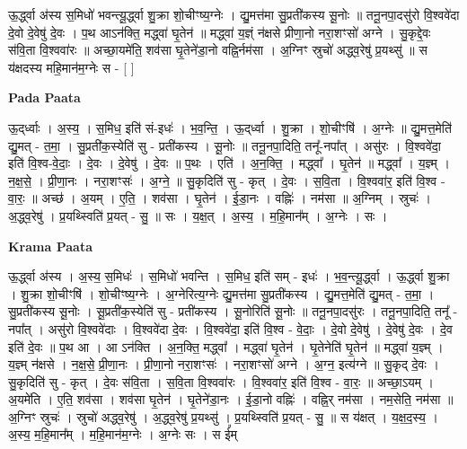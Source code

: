 \documentclass[17pt]{extarticle}
\begin{document}
ऊ॒र्द्ध्वा अ॑स्य स॒मिधो॑ भवन्त्यू॒र्द्ध्वा शु॒क्रा शो॒चीꣳष्य॒ग्नेः । द्यु॒मत्त॑मा सु॒प्रती॑कस्य सू॒नोः ॥ तनू॒नपा॒दसु॑रो वि॒श्ववे॑दा दे॒वो दे॒वेषु॑ दे॒वः । प॒थ आऽन॑क्ति॒ मद्ध्वा॑ घृ॒तेन॑ ॥ मद्ध्वा॑ य॒ज्ञ्ं न॑क्षसे प्रीणा॒नो नरा॒शꣳसो॑ अग्ने । सु॒कृद्दे॒वः स॑वि॒ता वि॒श्ववा॑रः ॥ अच्छा॒यमे॑ति॒ शव॑सा घृ॒तेने॑डा॒नो वह्नि॒र्नम॑सा । अ॒ग्निꣳ स्रुचो॑ अद्ध्व॒रेषु॑ प्र॒यथ्सु॑ ॥ स य॑क्षदस्य महि॒मान॑म॒ग्नेः स - [  ] \newline

\textbf{Pada Paata} \newline

ऊ॒द्‌र्ध्वाः । अ॒स्य॒ । स॒मिध॒ इति॑ सं-इधः॑ । भ॒व॒न्ति॒ । ऊ॒द्‌र्ध्वा । शु॒क्रा । शो॒चीꣳषि॑ । अ॒ग्नेः ॥ द्यु॒मत्त॒मेति॑ द्यु॒मत् - त॒मा॒ । सु॒प्रती॑क॒स्येति॑ सु - प्रती॑कस्य । सू॒नोः ॥ तनू॒नपा॒दिति॒ तनू᳚-नपा᳚त् । असु॑रः । वि॒श्ववे॑दा॒ इति॑ वि॒श्व-वे॒दाः॒ । दे॒वः । दे॒वेषु॑ । दे॒वः ॥ प॒थः । एति॑ । अ॒न॒क्ति॒ । मद्ध्वा᳚ । घृ॒तेन॑ ॥ मद्ध्वा᳚ । य॒ज्ञ्म् । न॒क्ष॒से॒ । प्री॒णा॒नः । नरा॒शꣳसः॑ । अ॒ग्ने॒ ॥ सु॒कृदिति॑ सु - कृत् । दे॒वः । स॒वि॒ता । वि॒श्ववा॑र॒ इति॑ वि॒श्व - वा॒रः॒ ॥ अच्छ॑ । अ॒यम् । ए॒ति॒ । शव॑सा । घृ॒तेन॑ । ई॒डा॒नः । वह्निः॑ । नम॑सा ॥ अ॒ग्निम् । स्रुचः॑ । अ॒द्ध्व॒रेषु॑ । प्र॒यथ्स्विति॑ प्र॒यत् - सु॒ ॥ सः । य॒क्ष॒त् । अ॒स्य॒ । म॒हि॒मान᳚म् । अ॒ग्नेः । सः ।  \newline


\textbf{Krama Paata} \newline

ऊ॒र्द्ध्वा अ॑स्य । अ॒स्य॒ स॒मिधः॑ । स॒मिधो॑ भवन्ति । स॒मिध॒ इति॑ सम् - इधः॑ । भ॒व॒न्त्यू॒र्द्ध्वा । ऊ॒र्द्ध्वा शु॒क्रा । शु॒क्रा शो॒चीꣳषि॑ । शो॒चीꣳष्य॒ग्नेः । अ॒ग्नेरित्य॒ग्नेः  द्यु॒मत्त॑मा सु॒प्रती॑कस्य । द्यु॒मत्त॒मेति॑ द्यु॒मत् - त॒मा॒ । सु॒प्रती॑कस्य सू॒नोः । सू॒प्रती॑क॒स्येति॑ सु - प्रती॑कस्य । सू॒नोरिति॑ सू॒नोः ॥ तनू॒नपा॒दसु॑रः । तनू॒नपा॒दिति॒ तनू᳚ - नपा᳚त् । असु॑रो वि॒श्ववे॑दाः । वि॒श्ववे॑दा दे॒वः । वि॒श्ववे॑दा॒ इति॑ वि॒श्व - वे॒दाः॒ । दे॒वो दे॒वेषु॑ । दे॒वेषु॑ दे॒वः । दे॒व इति॑ दे॒वः ॥ प॒थ आ । आ ऽन॑क्ति । अ॒न॒क्ति॒ मद्ध्वा᳚ । मद्ध्वा॑ घृ॒तेन॑ । घृ॒तेनेति॑ घृ॒तेन॑ ॥ मद्ध्वा॑ य॒ज्ञ्म् । य॒ज्ञ्म् न॑क्षसे । न॒क्ष॒से॒ प्री॒णा॒नः । प्री॒णा॒नो नरा॒शꣳसः॑ । नरा॒शꣳसो॑ अग्ने । अ॒ग्न॒ इत्य॑ग्ने ॥ सु॒कृद् दे॒वः । सु॒कृदिति॑ सु - कृत् । दे॒वः स॑वि॒ता । स॒वि॒ता वि॒श्ववा॑रः । वि॒श्ववा॑र॒ इति॑ वि॒श्व - वा॒रः॒ ॥ अच्छा॒ऽयम् । अ॒यमे॑ति । ए॒ति॒ शव॑सा । शव॑सा घृ॒तेन॑ । घृ॒तेने॑डा॒नः । ई॒डा॒नो वह्निः॑ । वह्नि॒र् नम॑सा । नम॒सेति॒ नम॑सा ॥ अ॒ग्निꣳ स्रुचः॑ । स्रुचो॑ अद्ध्व॒रेषु॑ । अ॒द्ध्व॒रेषु॑ प्र॒यथ्सु॑ । प्र॒यथ्स्विति॑ प्र॒यत् - सु॒ ॥ स य॑क्षत् । य॒क्ष॒द॒स्य॒ । अ॒स्य॒ म॒हि॒मान᳚म् । म॒हि॒मान॑म॒ग्नेः । अ॒ग्नेः सः । स ई᳚म् \newline
\end{document}
